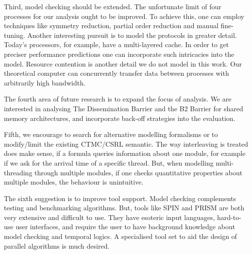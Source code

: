 \documentclass[a4paper, 10pt]{article}
\begin{document}
Third, model checking should be extended. The unfortunate limit of four processes for our analysis ought to be improved. To achieve this, one can employ techniques like symmetry reduction, partial order reduction and manual fine-tuning.
Another interesting pursuit is to model the protocols in greater detail. Today's processors, for example, have a multi-layered cache. In order to get preciser performance predictions one can incorporate such intricacies into the model.
Resource contention is another detail we do not model in this work. Our theoretical computer can concurrently transfer data between processes with arbitrarily high bandwidth.

The fourth area of future research is to expand the focus of analysis. We are interested in analysing The Dissemination Barrier and the B2 Barrier for shared memory architectures, and incorporate back-off strategies into the evaluation.

Fifth, we encourage to search for alternative modelling formalisms or to modify/limit the existing CTMC/CSRL semantic. The way interleaving is treated does make sense, if a formula queries information about one module, for example if we ask for the arrival time of a specific thread. But, when modelling multi-threading through multiple modules, if one checks quantitative properties about multiple modules, the behaviour is unintuitive.

The sixth suggestion is to improve tool support. Model checking complements testing and benchmarking algorithms. But, tools like SPIN and PRISM are both very extensive and difficult to use. They have esoteric input languages, hard-to-use user interfaces, and require the user to have background knowledge about model checking and temporal logics. A specialised tool set to aid the design of parallel algorithms is much desired.
\end{document}
